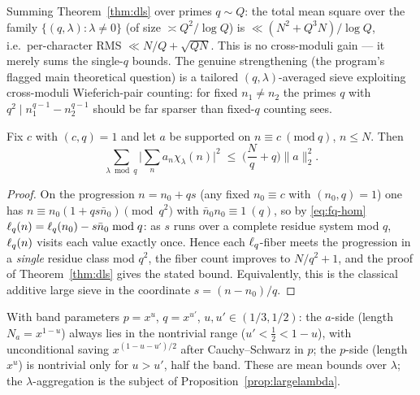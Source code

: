 \begin{corollary}\label{cor:crude}
\statusP\quad
Summing Theorem~\ref{thm:dls} over primes $q\sim Q$: the total mean square
over the family $\{(q,\lambda):\lambda\ne0\}$ (of size $\asymp Q^2/\log Q$)
is $\ll(N^2+Q^3N)/\log Q$, i.e.\ per-character RMS $\ll N/Q+\sqrt{QN}$.
This is no cross-moduli gain --- it merely sums the single-$q$ bounds. The
genuine strengthening (the program's flagged main theoretical question) is
a tailored $(q,\lambda)$-averaged sieve exploiting cross-moduli
Wieferich-pair counting: for fixed $n_1\ne n_2$ the primes $q$ with
$q^2\mid n_1^{q-1}-n_2^{q-1}$ should be far sparser than fixed-$q$ counting
sees.
\end{corollary}

\begin{corollary}\label{cor:ap}
\statusPM\quad
Fix $c$ with $(c,q)=1$ and let $a$ be supported on
$n\equiv c\ (\mathrm{mod}\ q)$, $n\le N$. Then
\[
\sum_{\lambda\bmod q}\Big|\sum_na_n\chi_\lambda(n)\Big|^2
\;\le\;\Big(\frac Nq+q\Big)\|a\|_2^2 .
\]
\end{corollary}

\begin{proof}
On the progression $n=n_0+qs$ (any fixed $n_0\equiv c$ with
$(n_0,q)=1$) one has $n\equiv n_0(1+qs\bar n_0)\pmod{q^2}$ with
$\bar n_0n_0\equiv1\ (q)$, so by \eqref{eq:fq-hom}
$\ell_q(n)=\ell_q(n_0)-s\bar n_0\bmod q$: as $s$ runs over a complete residue
system mod $q$, $\ell_q(n)$ visits each value exactly once. Hence each
$\ell_q$-fiber meets the progression in a \emph{single} residue class mod
$q^2$, the fiber count improves to $N/q^2+1$, and the proof of
Theorem~\ref{thm:dls} gives the stated bound. Equivalently, this is the
classical additive large sieve in the coordinate $s=(n-n_0)/q$.
\end{proof}

\begin{remark}
With band parameters $p=x^u$, $q=x^{u'}$, $u,u'\in(1/3,1/2)$: the
$a$-side (length $N_a=x^{1-u}$) always lies in the nontrivial range
($u'<\tfrac12<1-u$), with unconditional saving $x^{(1-u-u')/2}$ after
Cauchy--Schwarz in $p$; the $p$-side (length $x^u$) is nontrivial only
for $u>u'$, half the band. These are mean bounds over $\lambda$; the
$\lambda$-aggregation is the subject of
Proposition~\ref{prop:largelambda}.
\end{remark}
